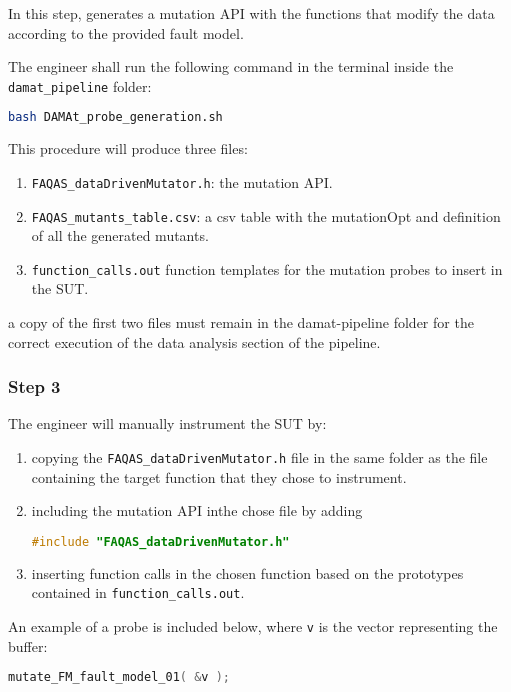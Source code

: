 In this step, \DAMA generates a mutation API with the functions that modify the data according to the provided fault model.

The engineer shall run the following command in the terminal inside the \texttt{damat\_pipeline} folder:

\begin{lstlisting}[language=bash]
bash DAMAt_probe_generation.sh
\end{lstlisting}

This procedure will produce three files:

\begin{enumerate}
	\item \texttt{FAQAS\_dataDrivenMutator.h}: the mutation API.
	\item \texttt{FAQAS\_mutants\_table.csv}: a csv table with the mutationOpt and definition of all the generated mutants.
	\item \texttt{function\_calls.out} function templates for the mutation probes to insert in the SUT.
\end{enumerate}

a copy of the first two files must remain in the damat-pipeline folder for the correct execution of the data analysis section of the pipeline.

\subsubsection{Step 3}
The engineer will manually instrument the SUT by:

\begin{enumerate}
	\item copying the \texttt{FAQAS\_dataDrivenMutator.h} file in the same folder as the file containing the target function that they chose to instrument.
	\item including the mutation API inthe chose file by adding
	\begin{lstlisting}[language=c]
	#include "FAQAS_dataDrivenMutator.h"
	\end{lstlisting}
	\item inserting function calls in the chosen function based on the prototypes contained in \texttt{function\_calls.out}.
\end{enumerate}

An example of a probe is included below, where \texttt{v} is the vector representing the buffer:
\begin{lstlisting}[language=c]
mutate_FM_fault_model_01( &v );
\end{lstlisting}

